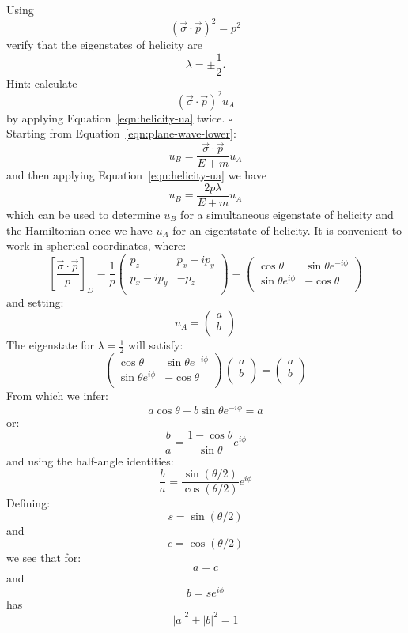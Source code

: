 \documentclass[12pt]{article}
\begin{document}
\exercise Using
$$(\vec{\sigma} \cdot \vec{p})^2 = p^2$$
verify that the eigenstates of helicity are
$$\lambda = \pm \frac{1}{2}.$$
Hint:  calculate
$$ (\vec{\sigma} \cdot \vec{p})^2 u_A$$
by applying Equation~\ref{eqn:helicity-ua} twice.
$\square$\\[5pt]
Starting from Equation~\ref{eqn:plane-wave-lower}:
$$u_B = \frac{\vec{\sigma}\cdot\vec{p}}{E+m} u_A $$
and then applying Equation~\ref{eqn:helicity-ua} we have
\begin{equation}
\label{eqn:lower-helicity}
u_B = \frac{2 p \lambda}{E+m} u_A
\end{equation}
which can be used to determine $u_B$ for a simultaneous eigenstate of
helicity and the Hamiltonian once we have $u_A$ for an eigentstate of
helicity.  It is convenient to work in spherical coordinates, where:
$$[\frac{\vec{\sigma}\cdot \vec{p}}{p}]_D =
\frac{1}{p}
\begin{pmatrix}
p_z & p_x-i p_y \\
p_x-i p_y & -p_z\\
\end{pmatrix}
=
\begin{pmatrix}
\cos \theta & \sin \theta e^{-i\phi} \\
\sin \theta e^{i\phi} & -\cos \theta \\
\end{pmatrix}
$$
and setting:
$$u_A =
\begin{pmatrix}
a \\
b \\
\end{pmatrix}
$$
The eigenstate for $\lambda = \frac{1}{2}$ will satisfy:
$$
\begin{pmatrix}
\cos \theta & \sin \theta e^{-i\phi} \\
\sin \theta e^{i\phi} & -\cos \theta \\
\end{pmatrix}
\,
\begin{pmatrix}
a \\
b \\
\end{pmatrix}
=
\begin{pmatrix}
a \\
b \\
\end{pmatrix}
$$
From which we infer:
$$a \cos\theta + b \sin \theta e^{-i\phi} = a$$
or:
$$\frac{b}{a} = \frac{1 - \cos \theta}{\sin \theta} e^{i\phi}$$
and using the half-angle identities:
$$ \frac{b}{a} = \frac{\sin(\theta/2)}{\cos(\theta/2)}e^{i\phi}$$
Defining:
$$s = \sin(\theta/2)$$
and
$$c = \cos(\theta/2)$$
we see that for:
$$a = c$$
and
$$b = s e^{i\phi}$$
has
$$|a|^2 + |b|^2 = 1$$
\end{document}
